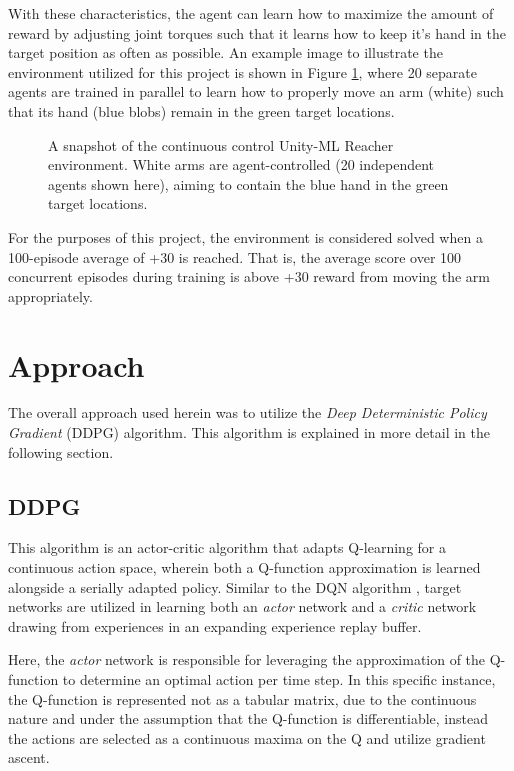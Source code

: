 \documentclass[11pt]{article}
\begin{document}
	With these characteristics, the agent can learn how to maximize the amount of reward by adjusting joint torques such that it learns how to keep it's hand in the target position as often as possible. An example image to illustrate the environment utilized for this project is shown in Figure \ref{fig:example-game-image}, where 20 separate agents are trained in parallel to learn how to properly move an arm (white) such that its hand (blue blobs) remain in the green target locations.
	
	\begin{figure}[!ht]
		\centering
		\caption{A snapshot of the continuous control Unity-ML Reacher environment. White arms are agent-controlled (20 independent agents shown here), aiming to contain the blue hand in the green target locations.}
		\label{fig:example-game-image}
	\end{figure}
	
	\FloatBarrier
	
	For the purposes of this project, the environment is considered solved when a 100-episode average of +30 is reached. That is, the average score over 100 concurrent episodes during training is above +30 reward from moving the arm appropriately.
	
	\section{Approach}
	
	The overall approach used herein was to utilize the \textit{Deep Deterministic Policy Gradient} (DDPG) algorithm. This algorithm is explained in more detail in the following section.
	
	\subsection{DDPG}
	
	This algorithm is an actor-critic algorithm that adapts Q-learning for a continuous action space, wherein both a Q-function approximation is learned alongside a serially adapted policy. Similar to the DQN algorithm \cite{dqn}, target networks are utilized in learning both an \textit{actor} network and a \textit{critic} network drawing from experiences in an expanding experience replay buffer.
	
	Here, the \textit{actor} network is responsible for leveraging the approximation of the Q-function to determine an optimal action per time step. In this specific instance, the Q-function is represented not as a tabular matrix, due to the continuous nature and under the assumption that the Q-function is differentiable, instead the actions are selected as a continuous maxima on the Q and utilize gradient ascent.
	
\end{document}
